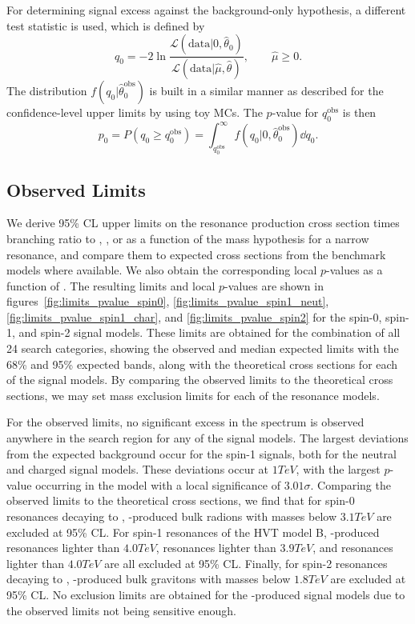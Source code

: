 For determining signal excess against the background-only hypothesis, a different test statistic is used, which is defined by
\begin{equation}
  q_0=-2\ln\frac{\mathcal{L}(\mathrm{data}|0,\hat{\theta}_0)}{\mathcal{L}(\mathrm{data}|\hat{\mu},\hat{\theta})},\qquad \hat{\mu}\geq0.
\end{equation}
The distribution $f(q_0|\hat{\theta}_0^\mathrm{obs})$ is built in a similar manner as described for the confidence-level upper limits by using toy MCs.
The $p$-value for $q_0^\mathrm{obs}$ is then
\begin{equation}
  p_0=P(q_0\geq q_0^\mathrm{obs})=\int_{q_0^\mathrm{obs}}^\infty f(q_0|0,\hat{\theta}_0^\mathrm{obs})\dd{q_0}.
\end{equation}

\subsection{Observed Limits}

We derive 95\% CL upper limits on the resonance production cross section times branching ratio to \WW, \WZ, or \WH as a function of the mass hypothesis \MX for a narrow resonance, and compare them to expected cross sections from the benchmark models where available.
We also obtain the corresponding local $p$-values as a function of \MX.
The resulting limits and local $p$-values are shown in figures~\ref{fig:limits_pvalue_spin0}, \ref{fig:limits_pvalue_spin1_neut}, \ref{fig:limits_pvalue_spin1_char}, and \ref{fig:limits_pvalue_spin2} for the spin-0, spin-1, and spin-2 signal models.
These limits are obtained for the combination of all 24 search categories, showing the observed and median expected limits with the 68\% and 95\% expected bands, along with the theoretical cross sections for each of the signal models.
By comparing the observed limits to the theoretical cross sections, we may set mass exclusion limits for each of the resonance models.

For the observed limits, no significant excess in the \MX spectrum is observed anywhere in the search region for any of the signal models.
The largest deviations from the expected background occur for the \VBF spin-1 signals, both for the neutral and charged signal models.
These deviations occur at $1\unit{TeV}$, with the largest $p$-value occurring in the \VBF\WprtoWZ model with a local significance of $3.01\sigma$.
Comparing the observed limits to the theoretical cross sections, we find that for spin-0 resonances decaying to \WW, \ggF-produced bulk radions with masses below $3.1\unit{TeV}$ are excluded at 95\% CL.
For spin-1 resonances of the HVT model B, \DY-produced \ZprtoWW resonances lighter than $4.0\unit{TeV}$, \WprtoWZ resonances lighter than $3.9\unit{TeV}$, and \WprtoWH resonances lighter than $4.0\unit{TeV}$ are all excluded at 95\% CL.
Finally, for spin-2 resonances decaying to \WW, \ggF-produced bulk gravitons with masses below $1.8\unit{TeV}$ are excluded at 95\% CL.
No exclusion limits are obtained for the \VBF-produced signal models due to the observed limits not being sensitive enough.

